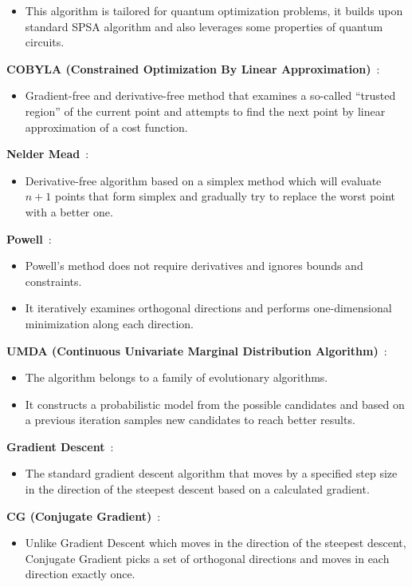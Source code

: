 \begin{itemize}
    \item This algorithm is tailored for quantum optimization problems, it builds upon standard SPSA algorithm and also leverages some properties of quantum circuits.
\end{itemize}
\textbf{COBYLA (Constrained Optimization By Linear Approximation)}~\cite{cobyla}:
\begin{itemize}
    \item Gradient-free and derivative-free method that examines a so-called ``trusted region'' of the current point and attempts to find the next point by linear approximation of a cost function.
\end{itemize}
\textbf{Nelder Mead}~\cite{nelder_mead}:
\begin{itemize}
    \item Derivative-free algorithm based on a simplex method which will evaluate $n+1$ points that form simplex and gradually try to replace the worst point with a better one.
\end{itemize}
\textbf{Powell}~\cite{powell}:
\begin{itemize}
    \item Powell's method does not require derivatives and ignores bounds and constraints.
    \item It iteratively examines orthogonal directions and performs one-dimensional minimization along each direction.
\end{itemize}
\textbf{UMDA (Continuous Univariate Marginal Distribution Algorithm)}~\cite{umda}:
\begin{itemize}
    \item The algorithm belongs to a family of evolutionary algorithms.
    \item It constructs a probabilistic model from the possible candidates and based on a previous iteration samples new candidates to reach better results.
\end{itemize}
\textbf{Gradient Descent}~\cite{gd}:
\begin{itemize}
    \item The standard gradient descent algorithm that moves by a specified step size in the direction of the steepest descent based on a calculated gradient.
\end{itemize}
\textbf{CG (Conjugate Gradient)}~\cite{cg}:
\begin{itemize}
    \item Unlike Gradient Descent which moves in the direction of the steepest descent, Conjugate Gradient picks a set of orthogonal directions and moves in each direction exactly once.
\end{itemize}
